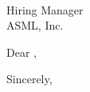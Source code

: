 \documentclass[10pt,letter]{letter}
\def\hm{} %
\def\company{ASML} %
\begin{document}
\begin{letter}{\hm \\ Hiring Manager \\ \company, Inc.  }

\opening{Dear \hm,}

\setlength\parindent{.5in}





\closing{Sincerely,}
\end{letter}
\end{document}
